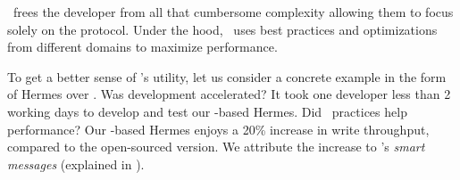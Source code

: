 \odlib\ frees the developer from all that cumbersome complexity allowing them to focus solely on the protocol. Under the hood, \odlib\ uses best practices and optimizations from different domains
to maximize performance.

To get a better sense of \odlib's utility, let us consider a concrete example in the form of 
Hermes over \odlib.  Was development accelerated? It took one developer less than 2 working days to develop and test our \odlib-based Hermes. Did \odlib\ practices help performance?
Our \odlib-based Hermes enjoys a 20\% increase in write throughput, compared to the open-sourced version. We attribute the increase to \odlib's \emph{smart messages} (explained in ).


